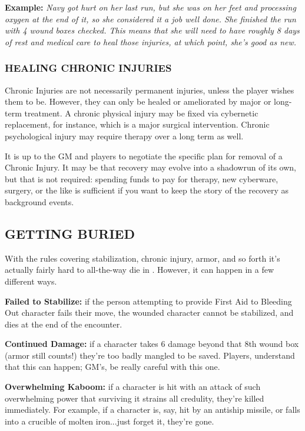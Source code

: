 \documentclass[oneside,10pt]{article}
\begin{document}
\begin{multicols}{2}
\begin{adjustwidth*}{.5cm}{.5cm}

\textbf{Example:} \textit{Navy got hurt on her last run, but she was on
her feet and processing oxygen at the end of it, so she
considered it a job well done. She finished the run with 4
wound boxes checked. This means that she will need to
have roughly 8 days of rest and medical care to heal those
injuries, at which point, she’s good as new.}
\end{adjustwidth*}
\subsubsection{HEALING CHRONIC INJURIES}
Chronic Injuries are not necessarily permanent injuries, unless
the player wishes them to be. However, they can only be
healed or ameliorated by major or long-term treatment. A
chronic physical injury may be fixed via cybernetic replacement, for instance, which is a major surgical intervention.
Chronic psychological injury may require therapy over a long
term as well.

It is up to the GM and players to negotiate the specific plan
for removal of a Chronic Injury. It may be that recovery may
evolve into a shadowrun of its own, but that is not required:
spending funds to pay for therapy, new cyberware, surgery,
or the like is sufficient if you want to keep the story of the
recovery as background events.

\subsection{GETTING BURIED}
With the rules covering stabilization, chronic injury, armor,
and so forth it’s actually fairly hard to
all-the-way die in \SW{}. However, it can happen
in a few different ways.
\begin{adjustwidth*}{.5cm}{.5cm}

\textbf{Failed to Stabilize:} if the person attempting to provide
First Aid to Bleeding Out character fails their move, the
wounded character cannot be stabilized, and dies at the
end of the encounter.

\textbf{Continued Damage:} if a character takes 6 damage beyond
that 8th wound box (armor still counts!) they’re too badly mangled to be saved. Players, understand that this can
happen; GM’s, be really careful with this one.

\textbf{Overwhelming Kaboom:} if a character is hit with an attack of such overwhelming power that surviving it strains
all credulity, they’re killed immediately. For example, if a
character is, say, hit by an antiship missile, or falls into a
crucible of molten iron...just forget it, they’re
gone.
\end{adjustwidth*}

\end{multicols}
\end{document}

